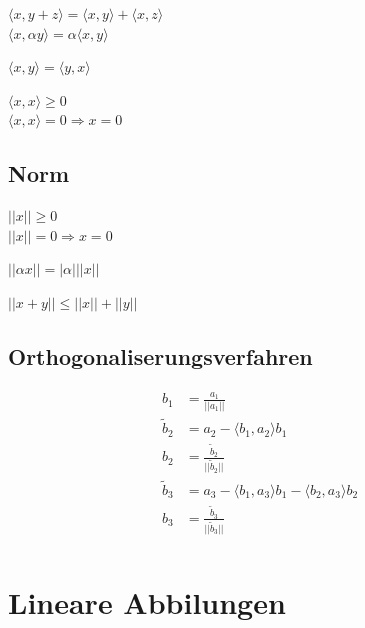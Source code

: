 \documentclass[11pt]{article}
\begin{document}
\begin{description}[labelindent=16pt,style=multiline,leftmargin=4cm, noitemsep]
	\item[linear] $\langle x, y+z\rangle = \langle x,y\rangle + \langle x, z\rangle$ \\ $\langle x, \alpha y \rangle = \alpha \langle x,y \rangle$
	\item[symmetrisch] $\langle x,y \rangle = \langle y,x \rangle$
	\item[positiv definit] $\langle x,x \rangle \geq 0$ \\ $\langle x,x \rangle = 0 \Rightarrow x = 0$
\end{description}

\subsection{Norm}

\begin{description}[labelindent=16pt,style=multiline,leftmargin=5cm, noitemsep]
	\item[positiv definit] $||x|| \geq 0$ \\ $||x|| = 0 \Rightarrow x = 0$
	\item[Homogenit{\"a}t] $||\alpha x || = |\alpha|||x||$
	\item[Dreiecksungleichung] $||x+y|| \leq ||x|| + ||y||$
\end{description}

\subsection{Orthogonaliserungsverfahren}

\begin{equation*}
\begin{split}
	b_1 & = \frac{a_1}{||a_1||} \\
	\tilde b_2 & = a_2 - \langle b_1, a_2 \rangle b_1 \\
	b_2 & = \frac{\tilde b_2}{||\tilde b_2||} \\
	\tilde b_3 & = a_3 - \langle b_1, a_3 \rangle b_1 - \langle b_2, a_3 \rangle b_2 \\
	b_3 & = \frac{\tilde b_3}{||\tilde b_3||} \\
\end{split}
\end{equation*}

\section{Lineare Abbilungen}
\end{document}
